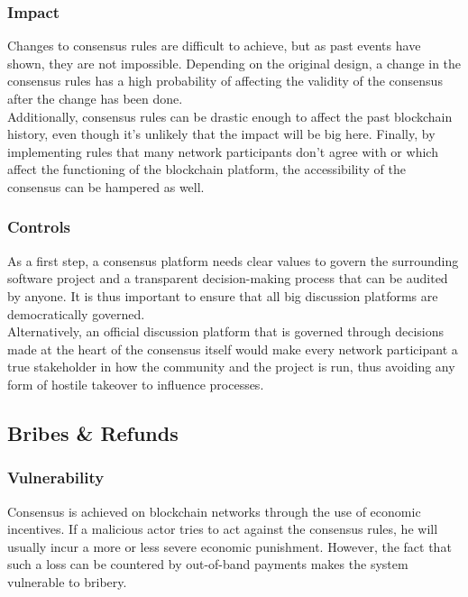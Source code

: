 \documentclass[11pt,a4paper,draft]{article}
\begin{document}
\subsubsection{Impact}

Changes to consensus rules are difficult to achieve, but as past events have shown, they are not impossible. Depending on the original design, a change in the consensus rules has a high probability of affecting the validity of the consensus after the change has been done.\\

Additionally, consensus rules can be drastic enough to affect the past blockchain history, even though it's unlikely that the impact will be big here. Finally, by implementing rules that many network participants don't agree with or which affect the functioning of the blockchain platform, the accessibility of the consensus can be hampered as well.\\

\subsubsection{Controls}

As a first step, a consensus platform needs clear values to govern the surrounding software project and a transparent decision-making process that can be audited by anyone. It is thus important to ensure that all big discussion platforms are democratically governed.\\

Alternatively, an official discussion platform that is governed through decisions made at the heart of the consensus itself would make every network participant a true stakeholder in how the community and the project is run, thus avoiding any form of hostile takeover to influence processes.\\

\subsection{Bribes \& Refunds}

\subsubsection{Vulnerability}

Consensus is achieved on blockchain networks through the use of economic incentives. If a malicious actor tries to act against the consensus rules, he will usually incur a more or less severe economic punishment. However, the fact that such a loss can be countered by out-of-band payments makes the system vulnerable to bribery.\\
\end{document}
